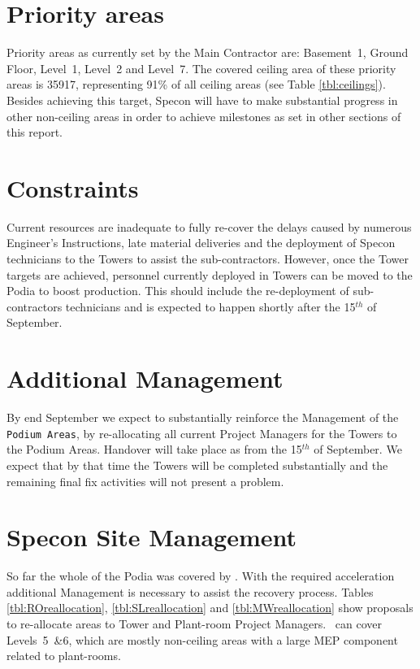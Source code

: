 \section{Priority areas}
Priority areas as currently set by the Main Contractor are: Basement~1, Ground Floor, Level~1, Level~2 and Level~7. The covered ceiling area of these priority areas is 35917\sm, representing  91\% of all ceiling areas (see Table \ref{tbl:ceilings}). Besides achieving this target,  Specon will have to make substantial progress in other non-ceiling areas in order to achieve milestones as set in other sections of this report. 




\section{Constraints}
\label{sec:podium}
Current resources are inadequate to fully re-cover the delays caused by numerous Engineer's Instructions, late material deliveries and the deployment of Specon technicians to the Towers to assist the sub-contractors. However, once the Tower targets are achieved, personnel currently deployed in Towers can be moved to the Podia to boost production. This should include the re-deployment of sub-contractors technicians and is expected to happen shortly after the 15$^{th}$ of September.

\section{Additional Management}

By end September we expect to substantially reinforce the Management of the \texttt{Podium Areas}, by re-allocating all current Project Managers for the Towers to the Podium Areas. Handover will take place as from the 15$^{th}$ of September. We expect that by that time the Towers will be completed substantially and the remaining final fix activities will not present a problem.






\section{Specon Site Management}

So far the whole of the Podia was covered by \RW . With the required acceleration additional Management is necessary to assist the recovery process. Tables \ref{tbl:ROreallocation}, \ref{tbl:SLreallocation} and \ref{tbl:MWreallocation} show proposals to re-allocate areas to Tower and Plant-room Project Managers. \GG\  can cover Levels~5~\&6, which are mostly non-ceiling areas with a large MEP component related to plant-rooms.

